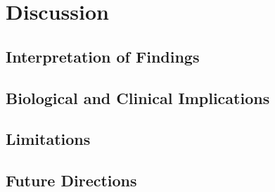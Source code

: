 \section{Discussion}

\subsection{Interpretation of Findings}

\subsection{Biological and Clinical Implications}

\subsection{Limitations}

\subsection{Future Directions}